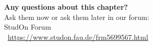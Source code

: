 \begin{frame}[c]
	\begin{center}
		{\bf Any questions about this chapter?}\\[0.5cm]
		Ask them now or ask them later in our forum: \\\bigskip
		StudOn Forum \\
		\faLink\ \url{https://www.studon.fau.de/frm5699567.html} \smallskip

	\end{center}
\end{frame}
